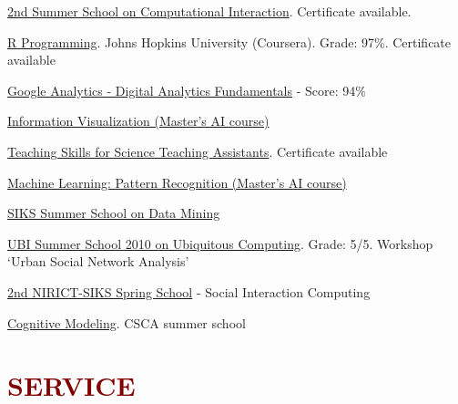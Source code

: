 \documentclass{article}
\newenvironment{innerlist}[1][\enskip\textbullet]%
        {\begin{compactenum}[#1]}{\end{compactenum}}
\begin{document}
\begin{innerlist}[-]

\item \href{http://userinterfaces.aalto.fi/computationalinteraction/}{2nd Summer School on Computational Interaction}. Certificate available.

\item \href{https://www.coursera.org/account/accomplishments/certificate/BS3AYZVDLB}{R Programming}. Johns Hopkins University (Coursera). Grade: 97\%. Certificate available

\item \href{https://analyticsacademy.withgoogle.com/course}{Google Analytics - Digital Analytics Fundamentals} - Score: 94\%

\item \href{http://studiegids.uva.nl/web/sgs/en/c/2000.html}{Information Visualization (Master's AI course)}

\item \href{http://www.science.uva.nl/amstelinstituut/higher/object.cfm/029CE488-1321-B0BE-A47D457360CDD7FD}{Teaching Skills for Science Teaching Assistants}. Certificate available

\item \href{http://studiegids.uva.nl/web/sgs/en/c/2000.html}{Machine Learning: Pattern Recognition (Master's AI course)}

\item \href{http://www.unimaas.nl/datamining/}{SIKS Summer School on Data Mining} 

\item \href{http://www.ubioulu.fi/en/UBI-summer-school-2010}{UBI Summer School 2010 on Ubiquitous Computing}. Grade: 5/5. Workshop `Urban Social Network Analysis'

\item \href{http://hmi.ewi.utwente.nl/lenteschool2010/introduction}{2nd NIRICT-SIKS Spring School} - Social Interaction Computing

\item \href{http://www.csca.nl/}{Cognitive Modeling}. CSCA summer school

\end{innerlist}



\section*{\textcolor{maroon}{\normalsize SERVICE}}
\end{document}
